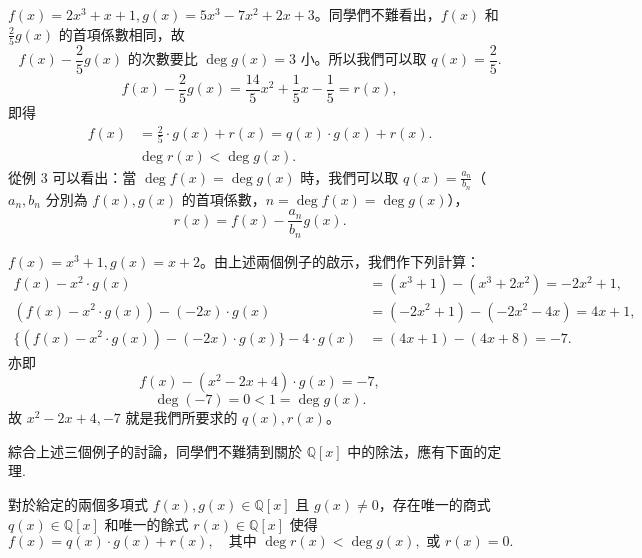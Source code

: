 \begin{example}\label{ex:5-4-3}
$f(x)=2x^3+x+1, g(x)=5x^3-7x^2+2x+3$。同學們不難看出，$f(x)$ 和 $\frac{2}{5}g(x)$ 的首項係數相同，故
\begin{equation*}
  f(x)-\frac{2}{5}g(x) \text{ 的次數要比 } \deg g(x)=3 \text{ 小。所以我們可以取 } q(x)=\frac{2}{5}.
\end{equation*}
\begin{equation*}
  f(x)-\frac{2}{5}g(x) = \frac{14}{5}x^2+\frac{1}{5}x-\frac{1}{5} = r(x),
\end{equation*}
即得
\begin{align*}
  f(x) &= \frac{2}{5} \cdot g(x) + r(x) = q(x) \cdot g(x) + r(x). \\
  &\deg r(x) < \deg g(x).
\end{align*}
從例 3 可以看出：當 $\deg f(x)=\deg g(x)$ 時，我們可以取 $q(x)=\frac{a_n}{b_n}$（$a_n, b_n$ 分別為 $f(x), g(x)$ 的首項係數，$n=\deg f(x)=\deg g(x)$），
\begin{equation*}
  r(x) = f(x) - \frac{a_n}{b_n}g(x).
\end{equation*}
\end{example}

\begin{example}\label{ex:5-4-4}
$f(x)=x^3+1, g(x)=x+2$。由上述兩個例子的啟示，我們作下列計算：
\begin{align*}
  f(x)-x^2 \cdot g(x) &= (x^3+1)-(x^3+2x^2) = -2x^2+1, \\
  (f(x)-x^2 \cdot g(x)) - (-2x) \cdot g(x) &= (-2x^2+1)-(-2x^2-4x) = 4x+1, \\
  \{(f(x)-x^2 \cdot g(x))-(-2x) \cdot g(x)\} - 4 \cdot g(x) &= (4x+1)-(4x+8) = -7.
\end{align*}
亦即
\begin{equation*}
  f(x) - (x^2-2x+4) \cdot g(x) = -7,
\end{equation*}
\begin{equation*}
  \deg(-7)=0 < 1 = \deg g(x).
\end{equation*}
故 $x^2-2x+4, -7$ 就是我們所要求的 $q(x), r(x)$。
\end{example}

綜合上述三個例子的討論，同學們不難猜到關於 $\mathbb{Q}[x]$ 中的除法，應有下面的定理.

\begin{theorem}[除法定理]\label{thm:poly_div}
對於給定的兩個多項式 $f(x), g(x) \in \mathbb{Q}[x]$ 且 $g(x) \neq 0$，存在唯一的商式 $q(x) \in \mathbb{Q}[x]$ 和唯一的餘式 $r(x) \in \mathbb{Q}[x]$ 使得
\begin{equation*}
  f(x) = q(x) \cdot g(x) + r(x), \quad \text{其中 } \deg r(x) < \deg g(x), \text{ 或 } r(x)=0.
\end{equation*}
\end{theorem}

